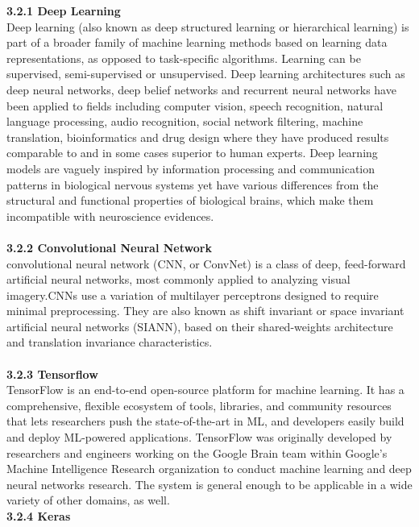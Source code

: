 \documentclass[12pt, English]{article}
\begin{document}
\begin{normalsize}
\textbf{3.2.1 Deep Learning}\\
Deep learning (also known as deep structured learning or hierarchical learning) is
part of a broader family of machine learning methods based on learning data representations, as opposed to task-specific algorithms. Learning can be supervised,
semi-supervised or unsupervised. Deep learning architectures such as deep neural
networks, deep belief networks and recurrent neural networks have been applied to
fields including computer vision, speech recognition, natural language processing, audio recognition, social network filtering, machine translation, bioinformatics and drug
design where they have produced results comparable to and in some cases superior to
human experts. Deep learning models are vaguely inspired by information processing
and communication patterns in biological nervous systems yet have various differences
from the structural and functional properties of biological brains, which make them
incompatible with neuroscience evidences.\\
\\ 
\textbf{3.2.2  Convolutional Neural Network}\\
convolutional neural network (CNN, or ConvNet) is a class
of deep, feed-forward artificial neural networks, most commonly applied to analyzing visual imagery.CNNs use a variation of multilayer perceptrons designed to require minimal preprocessing. They are also known as shift invariant or space invariant artificial neural networks (SIANN), based on their shared-weights architecture and translation invariance characteristics.\\

\\
\textbf{3.2.3  Tensorflow}\\
TensorFlow is an end-to-end open-source platform for machine learning. It has a comprehensive, flexible ecosystem of tools, libraries, and community resources that lets researchers push the state-of-the-art in ML, and developers easily build and deploy ML-powered applications. TensorFlow was originally developed by researchers and engineers working on the Google Brain team within Google’s Machine Intelligence Research organization to conduct machine learning and deep neural networks research. The system is general enough to be applicable in a wide variety of other domains, as well.
\\

\textbf{3.2.4 Keras  }\\


\end{normalsize}
\end{document}

